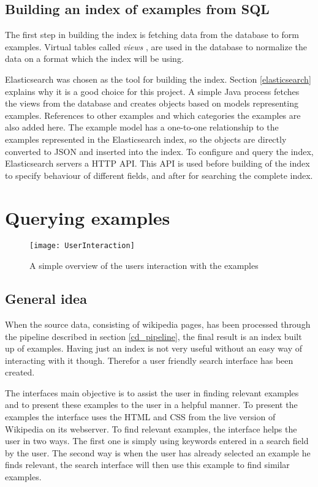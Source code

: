 \subsection{Building an index of examples from SQL}
The first step in building the index is fetching data from the database to form examples. Virtual tables called \textit{views}%
, are used in the database to normalize%
the data on a format which the index will be using.

Elasticsearch was chosen as the tool for building the index. Section \ref{elasticsearch} explains why it is a good choice for this project. A simple Java process fetches the views from the database and creates objects based on models representing examples. References to other examples and which categories the examples are also added here. The example model has a one-to-one relationship to the examples represented in the Elasticsearch index, so the objects are directly converted to JSON and inserted into the index. To configure and query the index, Elasticsearch servers a HTTP API. This API is used before building of the index to specify behaviour of different fields, and after for searching the complete index.


\section{Querying examples}

\begin{figure}[h]
\caption{A simple overview of the users interaction with the examples}
\texttt{[image: UserInteraction]}
\end{figure}

\subsection{General idea}
When the source data, consisting of wikipedia pages, has been processed through the pipeline described in section \ref{cd_pipeline}, the final result is an index built up of examples. Having just an index is not very useful without an easy way of interacting with it though. Therefor a user friendly search interface has been created. 

The interfaces main objective is to assist the user in finding relevant examples and to present these examples to the user in a helpful manner. To present the examples the interface uses the HTML and CSS from the live version of Wikipedia on its webserver. To find relevant examples, the interface helps the user in two ways. The first one is simply using keywords entered in a search field by the user. The second way is when the user has already selected an example he finds relevant, the search interface will then use this example to find similar examples.

